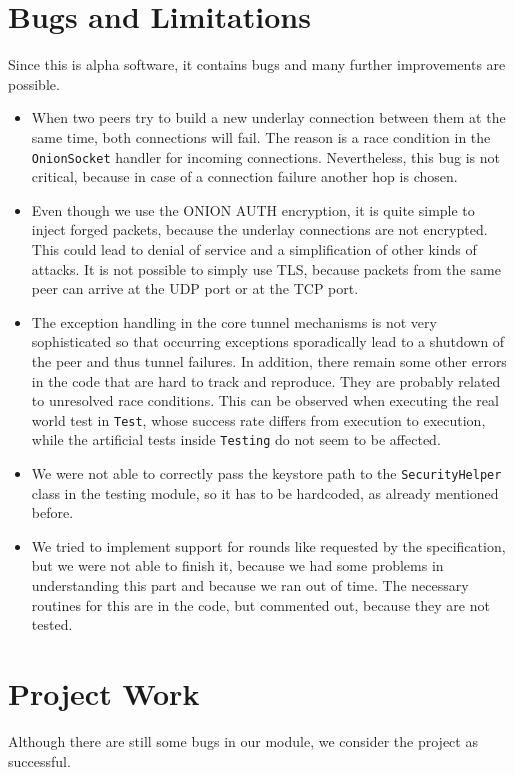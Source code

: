 \documentclass{article}
\begin{document}
\section{Bugs and Limitations}
Since this is alpha software, it contains bugs and many further improvements are possible.
\begin{itemize}
\item When two peers try to build a new underlay connection between them at the same time, both connections will fail. The reason is a race condition in the \texttt{OnionSocket} handler for incoming connections. Nevertheless, this bug is not critical, because in case of a connection failure another hop is chosen.
\item Even though we use the ONION AUTH encryption, it is quite simple to inject forged packets, because the underlay connections are not encrypted. This could lead to denial of service and a simplification of other kinds of attacks. It is not possible to simply use TLS, because packets from the same peer can arrive at the UDP port or at the TCP port.
\item The exception handling in the core tunnel mechanisms is not very sophisticated so that occurring exceptions sporadically lead to a shutdown of the peer and thus tunnel failures. In addition, there remain some other errors in the code that are hard to track and reproduce. They are probably related to unresolved race conditions. This can be observed when executing the real world test in \texttt{Test}, whose success rate differs from execution to execution, while the artificial tests inside \texttt{Testing} do not seem to be affected.
\item We were not able to correctly pass the keystore path to the \texttt{SecurityHelper} class in the testing module, so it has to be hardcoded, as already mentioned before.
\item We tried to implement support for rounds like requested by the specification, but we were not able to finish it, because we had some problems in understanding this part and because we ran out of time. The necessary routines for this are in the code, but commented out, because they are not tested. 
\end{itemize}

\section{Project Work}
Although there are still some bugs in our module, we consider the project as successful. 
\end{document}

